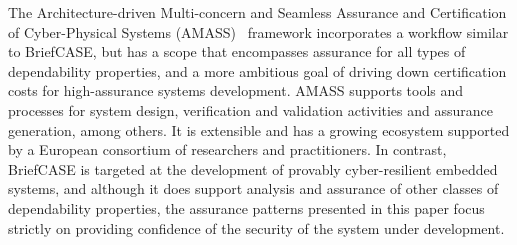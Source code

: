 The Architecture-driven Multi-concern and Seamless Assurance and Certification of Cyber-Physical Systems (AMASS)~\cite{AMASS} framework incorporates a workflow similar to BriefCASE, but has a scope that encompasses assurance for all types of dependability properties, and a more ambitious goal of driving down certification costs for high-assurance systems development. AMASS supports tools and processes for system design, verification and validation activities and assurance generation, among others.  It is extensible and has a growing ecosystem supported by a European consortium of researchers and practitioners.  In contrast, BriefCASE is targeted at the development of provably cyber-resilient embedded systems, and although it does support analysis and assurance of other classes of dependability properties, the assurance patterns presented in this paper focus strictly on providing confidence of the security of the system under development.



